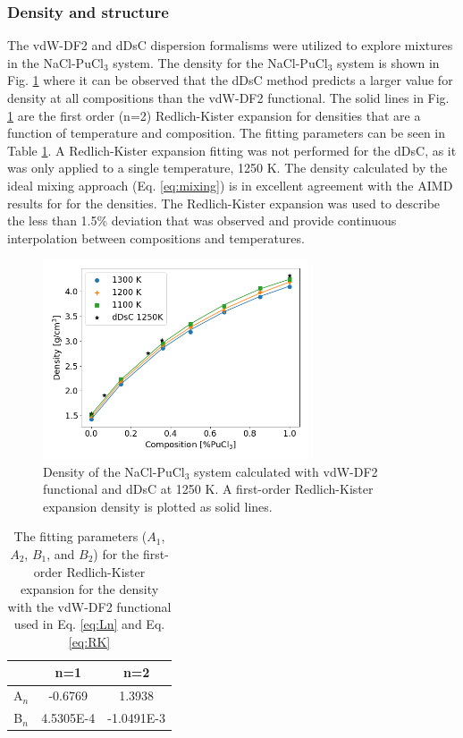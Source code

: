 \documentclass[review]{elsarticle}
\begin{document}
\subsubsection{Density and structure}
The vdW-DF2 and dDsC dispersion formalisms were utilized to explore mixtures in the NaCl-PuCl$_3$ system. The density for the NaCl-PuCl$_3$ system is shown in Fig. \ref{fig:density} where it can be observed that the dDsC method predicts a larger value for density at all compositions than the vdW-DF2 functional. The solid lines in Fig. \ref{fig:density} are the first order (n=2) Redlich-Kister expansion for densities that are a function of temperature and composition. The fitting parameters can be seen in Table \ref{Table:RK_fit}. A Redlich-Kister expansion fitting was not performed for the dDsC, as it was only applied to a single temperature, 1250 K. The density calculated by the ideal mixing approach (Eq. \ref{eq:mixing}) is in excellent agreement with the AIMD results for for the densities. The Redlich-Kister expansion was used to describe the less than 1.5\% deviation that was observed and provide continuous interpolation between compositions and temperatures.
\begin{figure}[h!]
 \centering
 \includegraphics[width=0.7\textwidth]{Redlich_Kister.png} 
 \caption{Density of the NaCl-PuCl$_3$ system calculated with vdW-DF2 functional and dDsC at 1250 K. A first-order Redlich-Kister expansion density is plotted as solid lines.}
 \label{fig:density}
\end{figure}

\begin{table}[h!]
\centering
\caption{The fitting parameters ($A_1$, $A_2$, $B_1$, and $B_2$) for the first-order Redlich-Kister expansion for the density with the vdW-DF2 functional used in Eq. \ref{eq:Ln} and Eq. \ref{eq:RK}}
\begin{tabular}{|c|c|c|}
\hline
  & n=1           & n=2           \\
\hline
A$_n$ & -0.6769 & 1.3938  \\
B$_n$ & 4.5305E-4  & -1.0491E-3 \\
\hline
\end{tabular}
\label{Table:RK_fit}
\end{table}
\end{document}
